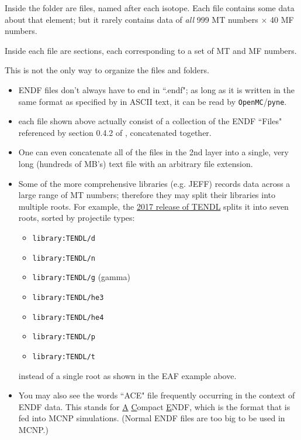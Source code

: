 \documentclass[a4paper, 12pt]{article}
\begin{document}
Inside the folder are files, named after each isotope. Each file contains some data about that element; but it rarely contains data of \emph{all} 999 MT numbers $\times$ 40 MF numbers.

Inside each file are sections, each corresponding to a set of MT and MF numbers.

This is not the only way to organize the files and folders.
\begin{itemize}
    \item ENDF files don't always have to end in ``.endf"; as long as it is written in the same format as specified by \cite{ENDFmanual} in ASCII text, it can be read by \texttt{OpenMC}/\texttt{pyne}.
    \item each file shown above actually consist of a collection of the ENDF ``Files" referenced by section 0.4.2 of \cite{ENDFmanual}, concatenated together.
    \item One can even concatenate all of the files in the 2nd layer into a single, very long (hundreds of MB's) text file with an arbitrary file extension.
    \item Some of the more comprehensive libraries (e.g. JEFF) records data across a large range of MT numbers; therefore they may split their libraries into multiple roots. For example, the \href{https://www-nds.iaea.org/public/download-endf/TENDL-2017/}{2017 release of TENDL} splits it into seven roots, sorted by projectile types:
    \begin{itemize}
        \item \texttt{library:TENDL/d}
        \item \texttt{library:TENDL/n}
        \item \texttt{library:TENDL/g} (gamma)
        \item \texttt{library:TENDL/he3}
        \item \texttt{library:TENDL/he4}
        \item \texttt{library:TENDL/p}
        \item \texttt{library:TENDL/t}
    \end{itemize}
    instead of a single root as shown in the EAF example above.
    \item You may also see the words ``ACE" file frequently occurring in the context of ENDF data. This stands for \underline{A} \underline{C}ompact \underline{E}NDF, which is the format that is fed into MCNP simulations. (Normal ENDF files are too big to be used in MCNP.)
\end{itemize}
\end{document}
